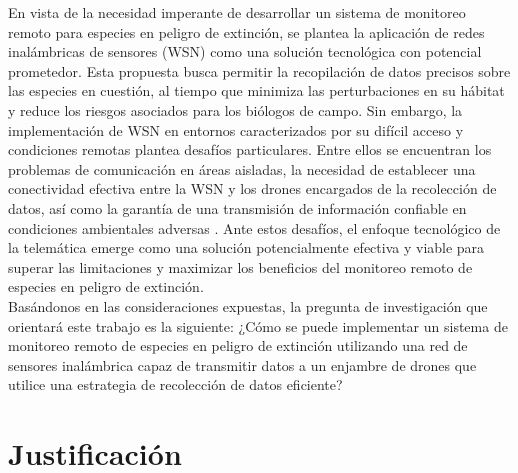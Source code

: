 En vista de la necesidad imperante de desarrollar un sistema de monitoreo remoto para especies en peligro de extinción, se plantea la aplicación de redes inalámbricas de sensores (WSN) como una solución tecnológica con potencial prometedor. Esta propuesta busca permitir la recopilación de datos precisos sobre las especies en cuestión, al tiempo que minimiza las perturbaciones en su hábitat y reduce los riesgos asociados para los biólogos de campo. Sin embargo, la implementación de WSN en entornos caracterizados por su difícil acceso y condiciones remotas plantea desafíos particulares. Entre ellos se encuentran los problemas de comunicación en áreas aisladas, la necesidad de establecer una conectividad efectiva entre la WSN y los drones encargados de la recolección de datos, así como la garantía de una transmisión de información confiable en condiciones ambientales adversas \cite{22.2}.
Ante estos desafíos, el enfoque tecnológico de la telemática emerge como una solución potencialmente efectiva y viable para superar las limitaciones y maximizar los beneficios del monitoreo remoto de especies en peligro de extinción.\\
Basándonos en las consideraciones expuestas, la pregunta de investigación que orientará este trabajo es la siguiente: ¿Cómo se puede implementar un sistema de monitoreo remoto de especies en peligro de extinción utilizando una red de sensores inalámbrica capaz de transmitir datos a un enjambre de drones que utilice una estrategia de recolección de datos eficiente?

\chapter{Justificación}

